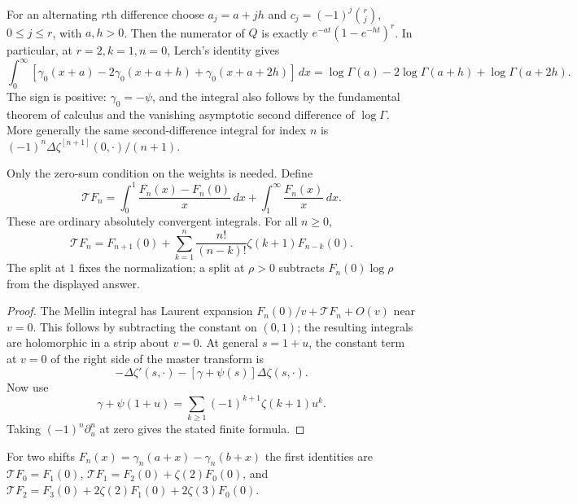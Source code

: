 For an alternating $r$th difference choose $a_j=a+jh$ and
$c_j=(-1)^j\binom rj$, $0\le j\le r$, with $a,h>0$.
Then the numerator of $Q$ is exactly $e^{-at}(1-e^{-ht})^r$.
In particular, at $r=2,k=1,n=0$, Lerch's identity gives
\begin{equation}\label{stmell:loggamma}
 \int_0^\infty
 [\gamma_0(x+a)-2\gamma_0(x+a+h)+\gamma_0(x+a+2h)]\,dx
 =\log\Gamma(a)-2\log\Gamma(a+h)+\log\Gamma(a+2h).
\end{equation}
The sign is positive: $\gamma_0=-\psi$, and the integral also follows
by the fundamental theorem of calculus and the vanishing asymptotic
second difference of $\log\Gamma$.
More generally the same second-difference integral for index $n$ is
$(-1)^n\Delta\zeta^{[n+1]}(0,\cdot)/(n+1)$.

\begin{theorem}
Only the zero-sum condition on the weights is needed. Define
\[
 \mathcal TF_n=
 \int_0^1\frac{F_n(x)-F_n(0)}x\,dx
 +\int_1^\infty\frac{F_n(x)}x\,dx.
\]
These are ordinary absolutely convergent integrals. For all $n\ge0$,
\begin{equation}\label{stmell:raising}
 \boxed{\displaystyle
 \mathcal TF_n=F_{n+1}(0)+
 \sum_{k=1}^n\frac{n!}{(n-k)!}\zeta(k+1)F_{n-k}(0).}
\end{equation}
The split at $1$ fixes the normalization; a split at $\rho>0$ subtracts
$F_n(0)\log\rho$ from the displayed answer.
\end{theorem}
\begin{proof}
The Mellin integral has Laurent expansion
$F_n(0)/v+\mathcal TF_n+O(v)$ near $v=0$. This follows by subtracting
the constant on $(0,1)$; the resulting integrals are holomorphic in a
strip about $v=0$. At general $s=1+u$, the constant term at $v=0$
of the right side of the master transform is
\[
 -\Delta\zeta'(s,\cdot)-[\gamma+\psi(s)]\Delta\zeta(s,\cdot).
\]
Now use
\[
 \gamma+\psi(1+u)
 =\sum_{k\ge1}(-1)^{k+1}\zeta(k+1)u^k.
\]
Taking $(-1)^n\partial_u^n$ at zero gives the stated finite formula.
\end{proof}

For two shifts $F_n(x)=\gamma_n(a+x)-\gamma_n(b+x)$ the first identities
are $\mathcal TF_0=F_1(0)$,
$\mathcal TF_1=F_2(0)+\zeta(2)F_0(0)$, and
$\mathcal TF_2=F_3(0)+2\zeta(2)F_1(0)+2\zeta(3)F_0(0)$.

